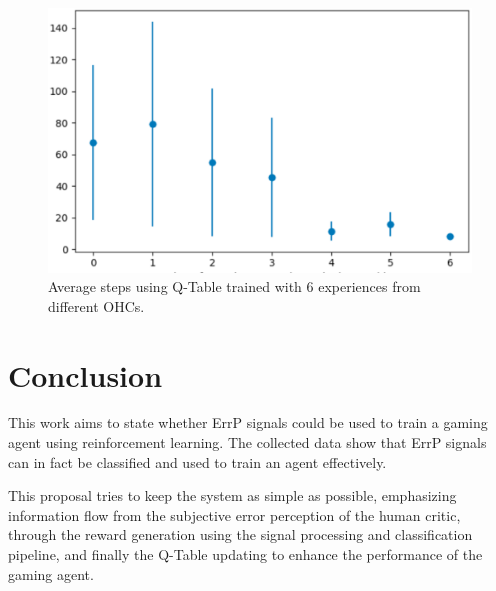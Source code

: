 \documentclass[journal]{IEEEtran}
\begin{document}
{{\begin{figure}[h!]
\centering
\includegraphics[scale=0.4]{Images/Average_steps/all.eps}
\caption{Average steps using Q-Table trained with 6 experiences from different OHCs.}
\label{fig:avg_steps_all}
\end{figure}

\section{Conclusion}
\label{conclusions}


This work aims to state whether ErrP signals could be used to train a gaming agent using reinforcement learning. The collected data show that ErrP signals can in fact be classified and used to train an agent effectively. 

This proposal tries to keep the system as simple as possible, emphasizing information flow from the subjective error perception of the human critic, through the reward generation using the signal processing and classification pipeline, and finally the Q-Table updating  to enhance the performance of the gaming agent.



}}
\end{document}

